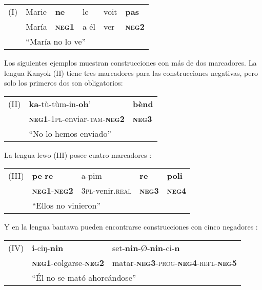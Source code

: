 {\setmainfont{Charis SIL} 

\begin{tabular}{llllll}
(I) & Marie & \textbf{ne} & le & voit & \textbf{pas} \\
& María & \textsc{\textbf{neg1}} & a él & ver & \textsc{\textbf{neg2}} \\
& \multicolumn{5}{l}{``María no lo ve''}
\end{tabular} \vspace{0.5cm}

}

Los siguientes ejemplos muestran construcciones con más de dos marcadores. La lengua Kanyok (II) tiene tres marcadores \textcolor{MidnightBlue}{\citep[pág. 263]{Devos2013}} para las construcciones negativas, pero solo los primeros dos son obligatorios: \vspace{0.5cm}

{\setmainfont{Charis SIL} 

\begin{tabular}{lll}
(II) & \textbf{ka}-tù-tùm-in-\textbf{oh}' & \textbf{bènd} \\
& \textsc{\textbf{neg1}-1pl-}enviar-\textsc{tam-\textbf{neg2}} & \textsc{\textbf{neg3}} \\
& \multicolumn{2}{l}{``No lo hemos enviado''}
\end{tabular} \vspace{0.5cm}}

La lengua lewo (III) posee cuatro marcadores \textcolor{MidnightBlue}{\citep[pág. 405]{Early1994}} \vspace{0.5cm}:

{\setmainfont{Charis SIL} 
\begin{tabular}{lllll}
(III) & \textbf{pe}-\textbf{re} & a-pim & \textbf{re} & \textbf{poli}  \\
& \textsc{\textbf{neg1}-\textbf{neg2}} & \textsc{3pl-}venir.\textsc{real} & \textsc{\textbf{neg3}} & \textsc{\textbf{neg4}} \\
& \multicolumn{4}{l}{``Ellos no vinieron''}
\end{tabular} \vspace{0.5cm}}

Y en la lengua bantawa pueden encontrarse construcciones con cinco negadores \textcolor{MidnightBlue}{\citep[pág. 271]{Doornenbal2009}}: \vspace{0.5cm}

{\setmainfont{Charis SIL} 
\begin{tabular}{lll}
(IV) & \textbf{i}-ciŋ-\textbf{nin} & set-\textbf{nin}-Ø-\textbf{nin}-ci-\textbf{n} \\
& \textsc{\textbf{neg1}}-colgarse-\textsc{\textbf{neg2}} & matar-\textsc{\textbf{neg3}-prog-\textbf{neg4}-refl-\textbf{neg5}} \\
& \multicolumn{2}{l}{``Él no se mató ahorcándose''}
\end{tabular} \vspace{0.5cm}}

